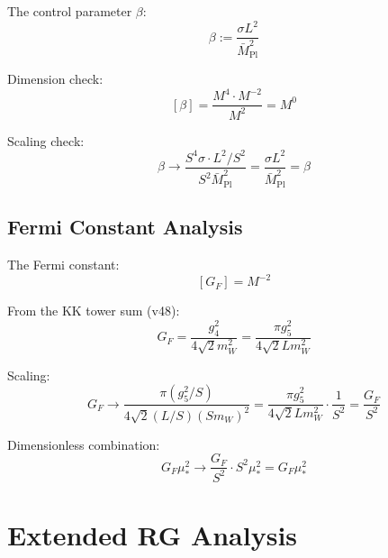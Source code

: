 \documentclass[11pt,a4paper]{article}
\theoremstyle{definition}
\begin{document}
The control parameter $\beta$:
\begin{equation}
\label{eq:beta_def_repeat}
\beta := \frac{\sigma L^2}{\bar{M}_{\text{Pl}}^2}
\end{equation}

Dimension check:
\begin{equation}
\label{eq:beta_dim_deriv}
[\beta] = \frac{M^4 \cdot M^{-2}}{M^2} = M^0
\end{equation}

Scaling check:
\begin{equation}
\label{eq:beta_scale_deriv}
\beta \to \frac{S^4 \sigma \cdot L^2/S^2}{S^2 \bar{M}_{\text{Pl}}^2} = \frac{\sigma L^2}{\bar{M}_{\text{Pl}}^2} = \beta
\end{equation}

\subsection{Fermi Constant Analysis}
\label{subsec:GF_analysis}

The Fermi constant:
\begin{equation}
\label{eq:GF_dim_deriv}
[G_F] = M^{-2}
\end{equation}

From the KK tower sum (v48):
\begin{equation}
\label{eq:GF_from_KK}
G_F = \frac{g_4^2}{4\sqrt{2} m_W^2} = \frac{\pi g_5^2}{4\sqrt{2} L m_W^2}
\end{equation}

Scaling:
\begin{equation}
\label{eq:GF_scale_deriv}
G_F \to \frac{\pi (g_5^2/S)}{4\sqrt{2} (L/S) (Sm_W)^2} = \frac{\pi g_5^2}{4\sqrt{2} L m_W^2} \cdot \frac{1}{S^2} = \frac{G_F}{S^2}
\end{equation}

Dimensionless combination:
\begin{equation}
\label{eq:GF_mu_deriv}
G_F \mu_*^2 \to \frac{G_F}{S^2} \cdot S^2 \mu_*^2 = G_F \mu_*^2
\end{equation}

\section{Extended RG Analysis}
\label{app:rg_extended2}
\end{document}
